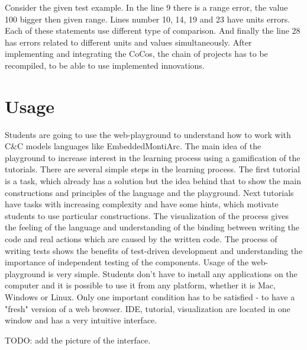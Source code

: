 \bigskip
Consider the given test example. In the line 9 there is a range error, the value 100 bigger then given range. Lines number 10, 14, 19 and 23 have units errors. Each of these statements use different type of comparison. And finally the line 28 has errors related to different units and values simultaneously. \newline
After implementing and integrating the CoCos, the chain of projects has to be recompiled, to be able to use implemented innovations.
\chapter{Usage} \label{sec:usage}
Students are going to use the web-playground to understand how to work with C\&C models languages like EmbeddedMontiArc. The main idea of the playground to increase interest in the learning process using a gamification of the tutorials. There are several simple steps in the learning process. The first tutorial is a task, which already has a solution but the idea behind that to show the main constructions and principles of the language and the playground. Next tutorials have tasks with increasing complexity and have some hints, which motivate students to use particular constructions. The visualization of the process gives the feeling of the language and understanding of the binding between writing the code and real actions which are caused by the written code. The process of writing tests shows the benefits of test-driven development and understanding the importance of independent testing of the components.
Usage of the web-playground is very simple. Students don't have to install any applications on the computer and it is possible to use it from any platform, whether it is Mac, Windows or Linux. Only one important condition has to be satisfied - to have a "fresh" version of a web browser. IDE, tutorial, visualization are located in one window and has a very intuitive interface.

TODO: add the picture of the interface.

